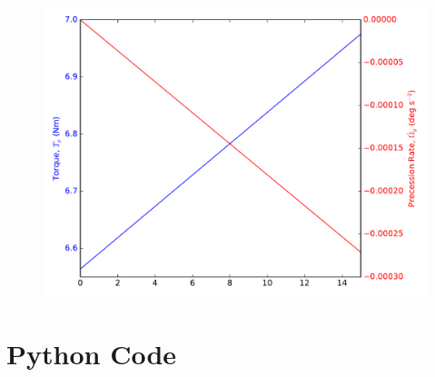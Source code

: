 \documentclass[onecolumn,10pt]{jhwhw}
\begin{document}
\begin{figure}[tbh!]
\begin{center}
\includegraphics[height=0.45\textheight]{p3_b.pdf}
\end{center}
\end{figure}

\clearpage
\appendix
\section{Python Code}

\end{document}
